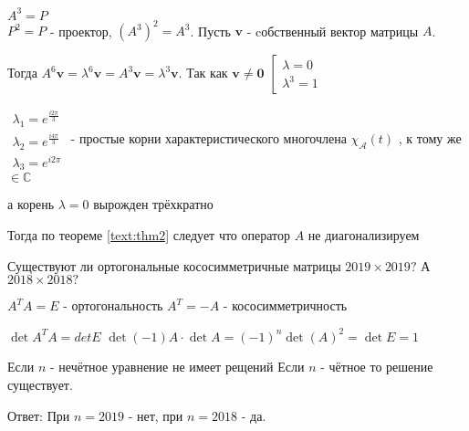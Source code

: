 \begin{solution}
	$ A^{3} = P $ \\
	$ P^2 = P $ - проектор,
	$ (A^3)^2 = A^3 $.
	Пусть $ \boldsymbol{v} $ - cобственный вектор матрицы $ A $.
	
	Тогда $ A^6 \boldsymbol{v} = \lambda^6 \boldsymbol{v} = A^{3} \boldsymbol{v} = \lambda^3 \boldsymbol{v}.$
	Так как $ \boldsymbol{v}\neq \boldsymbol{0} $
	$
	\left[\begin{array}{l}{\lambda=0} \\ {\lambda^{3}=1}\end{array}\right.
	$
	
	$
	\begin{array}{l}{\lambda_{1}=e^{\frac{i 2 \pi}{3}}} \\ {\lambda_{2}=e^{\frac{i 4 \pi}{3}}} \\ {\lambda_{3}=e^{i 2 \pi}}\end{array}
	$ - простые корни характеристического многочлена $\chi_{\mathcal{A}}(t)$ , к тому же $ \in \mathbb{C} $
	
	а корень $ \lambda = 0 $ вырожден трёхкратно
	
	Тогда по теореме \ref{text:thm2} следует что оператор $ A $ не диагонализируем
	
\end{solution}

\begin{problem}
Существуют ли ортогональные кососимметричные матрицы $2019 \times 2019?$ А $2018 \times 2018?$ 	
\end{problem}

\begin{solution}
	\par
	$ A^{T}A = E $ - ортогональность
	$ A^{T} = - A $ - кососимметричность
	
	$\det A^T A = det E $
	$ \det (-1)  A  \cdot \det A = (-1)^n \det(A)^2 = \det E = 1 $
	
	Если $ n $ - нечётное уравнение не имеет рещений
	Если $ n $ - чётное то решение существует.
	
	\par
	Ответ: При $ n = 2019  $ - нет, при $ n = 2018 $ - да.
	
	
\end{solution}	

				